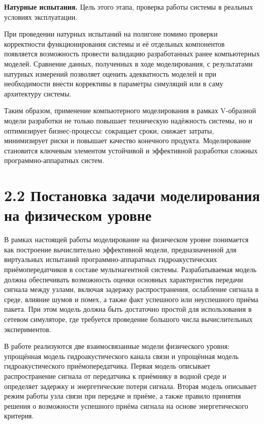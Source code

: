\textbf{Натурные испытания.} Цель этого этапа, проверка работы системы в
реальных условиях эксплуатации.

При проведении натурных испытаний на полигоне помимо проверки
корректности функционирования системы и её отдельных компонентов
появляется возможность провести валидацию разработанных ранее
компьютерных моделей. Сравнение данных, полученных в ходе моделирования,
с результатами натурных измерений позволяет оценить адекватность моделей
и при необходимости внести коррективы в параметры симуляций или в саму
архитектуру системы.

Таким образом, применение компьютерного моделирования в рамках
V-образной модели разработки не только повышает техническую надёжность
системы, но и оптимизирует бизнес-процессы: сокращает сроки, снижает
затраты, минимизирует риски и повышает качество конечного продукта.
Моделирование становится ключевым элементом устойчивой и эффективной
разработки сложных программно-аппаратных систем.

\section*{2.2 Постановка задачи моделирования на физическом
уровне}\label{ux43fux43eux441ux442ux430ux43dux43eux432ux43aux430-ux437ux430ux434ux430ux447ux438-ux43cux43eux434ux435ux43bux438ux440ux43eux432ux430ux43dux438ux44f-ux43dux430-ux444ux438ux437ux438ux447ux435ux441ux43aux43eux43c-ux443ux440ux43eux432ux43dux435}

В рамках настоящей работы моделирование на физическом уровне понимается
как построение вычислительно эффективной модели, предназначенной для
виртуальных испытаний программно-аппаратных гидроакустических
приёмопередатчиков в составе мультиагентной системы. Разрабатываемая
модель должна обеспечивать возможность оценки основных характеристик
передачи сигнала между узлами, включая задержку распространения,
ослабление сигнала в среде, влияние шумов и помех, а также факт
успешного или неуспешного приёма пакета. При этом модель должна быть
достаточно простой для использования в сетевом симуляторе, где требуется
проведение большого числа вычислительных экспериментов.

В работе реализуются две взаимосвязанные модели физического уровня:
упрощённая модель гидроакустического канала связи и упрощённая модель
гидроакустического приёмопередатчика. Первая модель описывает
распространение сигнала от передатчика к приёмнику в водной среде и
определяет задержку и энергетические потери сигнала. Вторая модель
описывает режим работы узла связи при передаче и приёме, а также правило
принятия решения о возможности успешного приёма сигнала на основе
энергетического критерия.


